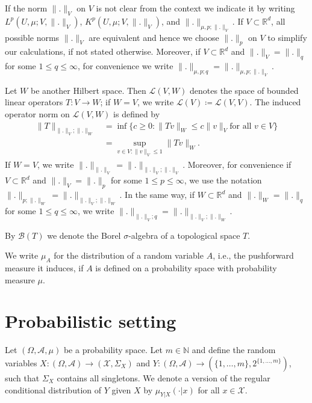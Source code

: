 \documentclass{article}
\begin{document}
If the norm $\|.\|_V$ on $V$ is not clear from the context we indicate it by
writing $L^p(U, \mu; V, \|.\|_V)$, $K^p(U, \mu; V, \|.\|_V)$, and
$\|.\|_{\mu,p;\|.\|_V}$. If $V \subset \mathbb{R}^d$, all possible norms
$\|.\|_V$ are equivalent and hence we choose $\|.\|_p$ on $V$ to simplify our
calculations, if not stated otherwise. Moreover, if $V \subset \mathbb{R}^d$
and $\|.\|_V = \|.\|_q$ for some $1 \leq q \leq \infty$, for convenience we
write $\|.\|_{\mu,p;q} = \|.\|_{\mu,p;\|.\|_V}$.

Let $W$ be another Hilbert space. Then $\mathcal{L}(V, W)$ denotes the space of
bounded linear operators $T \colon V \to W$; if $W = V$, we write
$\mathcal{L}(V) \coloneqq \mathcal{L}(V, V)$. The induced operator norm on
$\mathcal{L}(V, W)$ is defined by
\begin{equation*}
  \begin{split}
     \|T\|_{\|.\|_V; \|.\|_W} &= \inf \{ c \geq 0 \colon \|Tv\|_W \leq c \|v\|_V \text{for all } v \in V\} \\
     &= \sup_{v \in V \colon \|v\|_V \leq 1} \|Tv\|_W.
  \end{split}
\end{equation*}
If $W = V$, we write $\|.\|_{\|.\|_V} = \|.\|_{\|.\|_V; \|.\|_V}$. Moreover, for
convenience if $V \subset \mathbb{R}^d$ and $\|.\|_V = \|.\|_p$ for some
$1 \leq p \leq \infty$, we use the notation
$\|.\|_{p;\|.\|_W} = \|.\|_{\|.\|_V; \|.\|_W}$. In the same way, if
$W \subset \mathbb{R}^d$ and $\|.\|_W = \|.\|_q$ for some
$1 \leq q \leq \infty$, we write $\|.\|_{\|.\|_V; q} = \|.\|_{\|.\|_V;\|.\|_W}$.

By $\mathcal{B}(T)$ we denote the Borel $\sigma$-algebra of a topological space
$T$.

We write $\mu_A$ for the distribution of a random variable $A$, i.e., the
pushforward measure it induces, if $A$ is defined on a probability space with
probability measure $\mu$.

\section{Probabilistic setting}

Let $(\Omega, \mathcal{A}, \mu)$ be a probability space. Let $m \in \mathbb{N}$
and define the random variables
$X \colon (\Omega, \mathcal{A}) \to (\mathcal{X}, \Sigma_X)$ and
$Y \colon (\Omega, \mathcal{A}) \to (\{1,\ldots,m\}, 2^{\{1,\ldots,m\}})$, such that
$\Sigma_X$ contains all singletons. We denote a version of the regular
conditional distribution of $Y$ given $X$ by $\mu_{Y|X}(\cdot|x)$ for all
$x \in \mathcal{X}$.
\end{document}
